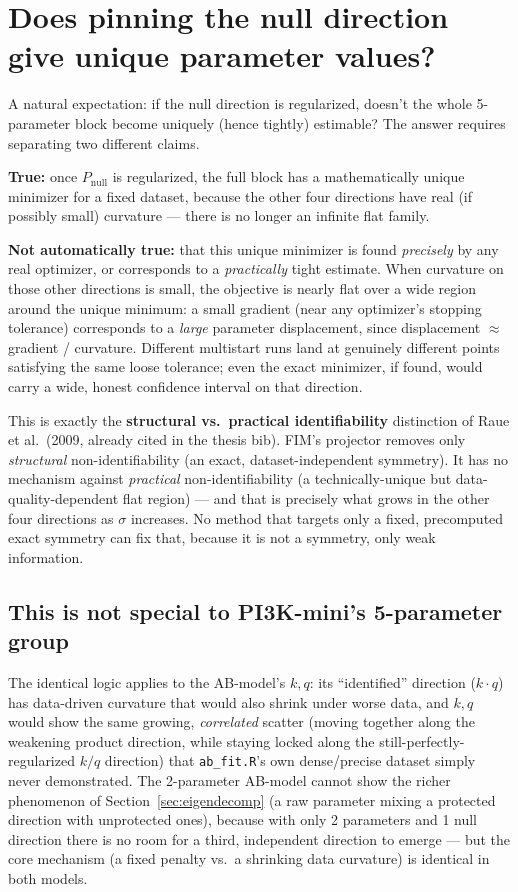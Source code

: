 \documentclass[11pt]{article}
\newcommand{\code}[1]{\texttt{#1}}
\begin{document}
\section{Does pinning the null direction give unique parameter values?}
\label{sec:practical}

A natural expectation: if the null direction is regularized, doesn't the
whole 5-parameter block become uniquely (hence tightly) estimable? The
answer requires separating two different claims.

\textbf{True:} once $P_{\text{null}}$ is regularized, the full block has a
mathematically unique minimizer for a fixed dataset, because the other four
directions have real (if possibly small) curvature --- there is no longer an
infinite flat family.

\textbf{Not automatically true:} that this unique minimizer is found
\emph{precisely} by any real optimizer, or corresponds to a
\emph{practically} tight estimate. When curvature on those other directions
is small, the objective is nearly flat over a wide region around the unique
minimum: a small gradient (near any optimizer's stopping tolerance)
corresponds to a \emph{large} parameter displacement, since displacement
$\approx$ gradient / curvature. Different multistart runs land at genuinely
different points satisfying the same loose tolerance; even the exact
minimizer, if found, would carry a wide, honest confidence interval on that
direction.

This is exactly the \textbf{structural vs.\ practical identifiability}
distinction of Raue et al.\ (2009, already cited in the thesis bib). FIM's
projector removes only \emph{structural} non-identifiability (an exact,
dataset-independent symmetry). It has no mechanism against \emph{practical}
non-identifiability (a technically-unique but data-quality-dependent flat
region) --- and that is precisely what grows in the other four directions as
$\sigma$ increases. No method that targets only a fixed, precomputed exact
symmetry can fix that, because it is not a symmetry, only weak information.

\subsection{This is not special to PI3K-mini's 5-parameter group}

The identical logic applies to the AB-model's $k,q$: its ``identified''
direction ($k\cdot q$) has data-driven curvature that would also shrink under
worse data, and $k,q$ would show the same growing, \emph{correlated} scatter
(moving together along the weakening product direction, while staying locked
along the still-perfectly-regularized $k/q$ direction) that
\code{ab\_fit.R}'s own dense/precise dataset simply never demonstrated. The
2-parameter AB-model cannot show the richer phenomenon of Section~\ref{sec:eigendecomp}
(a raw parameter mixing a protected direction with unprotected ones), because
with only 2 parameters and 1 null direction there is no room for a third,
independent direction to emerge --- but the core mechanism (a fixed penalty
vs.\ a shrinking data curvature) is identical in both models.
\end{document}
